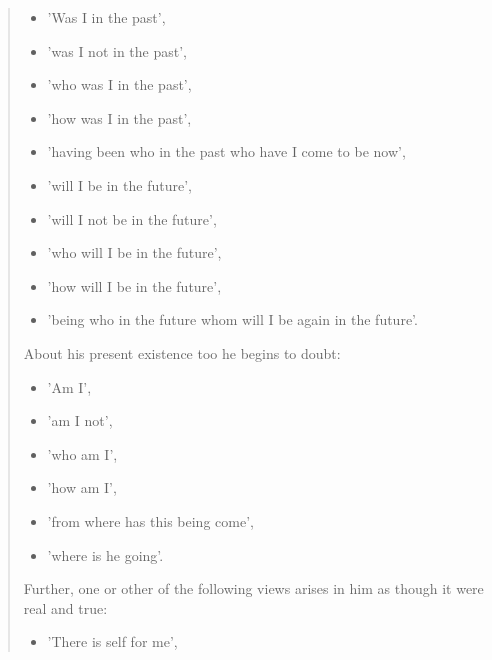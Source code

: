 \begin{quotation}
\begin{itemize}

\item 'Was I in the past',

\item 'was I not in the past',

\item 'who was I in the past',

\item 'how was I in the past',

\item 'having been who in the past who have I come to be now',

\item 'will I be in the future',

\item 'will I not be in the future',

\item 'who will I be in the future',

\item 'how will I be in the future',

\item 'being who in the future whom will I be again in the future'.

\end{itemize}


About his present existence too he begins to doubt:


\begin{itemize}

\item 'Am I',

\item 'am I not',

\item 'who am I',

\item 'how am I',

\item 'from where has this being come',

\item 'where is he going'.

\end{itemize}


Further, one or other of the following views arises in him as though it
were real and true:


\begin{itemize}

\item 'There is self for me',


\end{itemize}
\end{quotation}
